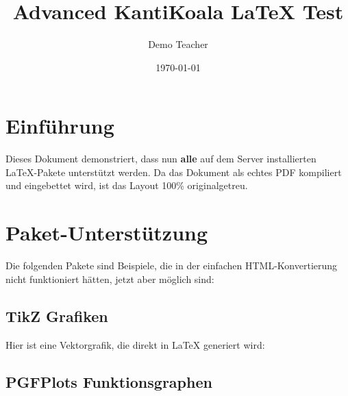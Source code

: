 \documentclass[12pt, a4paper]{article}
\title{\textbf{Advanced KantiKoala LaTeX Test}}
\author{Demo Teacher}
\date{\today}
\begin{document}
\maketitle

\section{Einführung}
Dieses Dokument demonstriert, dass nun \textbf{alle} auf dem Server installierten LaTeX-Pakete unterstützt werden. Da das Dokument als echtes PDF kompiliert und eingebettet wird, ist das Layout 100\% originalgetreu.

\section{Paket-Unterstützung}

Die folgenden Pakete sind Beispiele, die in der einfachen HTML-Konvertierung nicht funktioniert hätten, jetzt aber möglich sind:

\subsection{TikZ Grafiken}
Hier ist eine Vektorgrafik, die direkt in LaTeX generiert wird:

\begin{center}
\end{center}

\subsection{PGFPlots Funktionsgraphen}
\begin{center}
\end{center}
\end{document}
